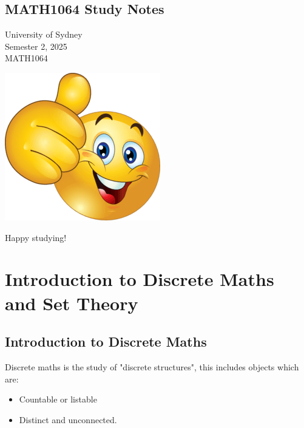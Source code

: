 \documentclass[12pt]{article}
\newcommand{\studyunit}{MATH1064}
\newcommand{\studyperiod}{Semester 2, 2025}
\theoremstyle{definition}
\begin{document}
    \begin{titlepage}
        \begin{center}
            \vspace*{1cm}

            \section*{MATH1064 Study Notes}

            \vspace{0.25cm}
            University of Sydney \\
            \studyperiod \\
            \studyunit

            \vfill
            \includegraphics{thumbs_up_emoji.png}
            \vspace{1.5cm}

            Happy studying!
            
       \vspace{0.8cm}
            
        \end{center}
    \end{titlepage}

    \tableofcontents
    
    \newpage
    \section{Introduction to Discrete Maths and Set Theory}
    \subsection{Introduction to Discrete Maths}

        Discrete maths is the study of "discrete structures", this includes objects which are:
        \begin{itemize}
            \item Countable or listable
            \item Distinct and unconnected.
        \end{itemize}
\end{document}
